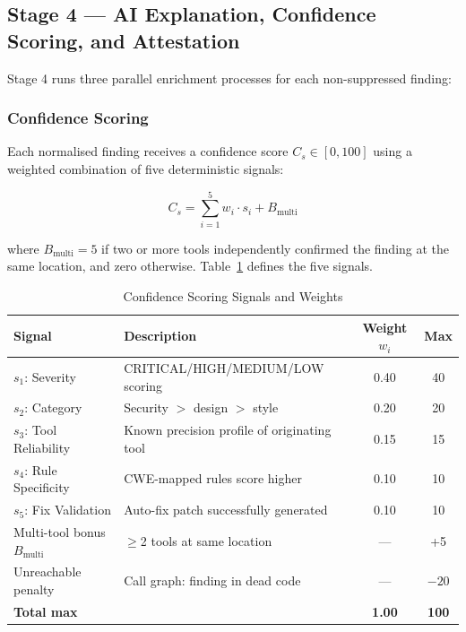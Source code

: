 \subsection{Stage 4 — AI Explanation, Confidence Scoring, and Attestation}
\label{subsec:stage4}

Stage 4 runs three parallel enrichment processes for each non-suppressed finding:

\subsubsection{Confidence Scoring}

Each normalised finding receives a confidence score $C_s \in [0, 100]$ using a weighted combination of five deterministic signals:

\begin{equation}
  C_s = \sum_{i=1}^{5} w_i \cdot s_i + B_{\text{multi}}
  \label{eq:confidence_score}
\end{equation}

\noindent where $B_{\text{multi}} = 5$ if two or more tools independently confirmed the finding at the same location, and zero otherwise. Table~\ref{tab:confidence_signals} defines the five signals.

\begin{table}[H]
\caption{Confidence Scoring Signals and Weights}
\label{tab:confidence_signals}
\centering
\renewcommand{\arraystretch}{1.3}
\begin{tabularx}{\textwidth}{@{} l X c c @{}}
\toprule
\textbf{Signal} & \textbf{Description} & \textbf{Weight $w_i$} & \textbf{Max} \\
\midrule
$s_1$: Severity         & CRITICAL/HIGH/MEDIUM/LOW scoring           & 0.40 & 40 \\
$s_2$: Category         & Security $>$ design $>$ style              & 0.20 & 20 \\
$s_3$: Tool Reliability & Known precision profile of originating tool & 0.15 & 15 \\
$s_4$: Rule Specificity & CWE-mapped rules score higher              & 0.10 & 10 \\
$s_5$: Fix Validation   & Auto-fix patch successfully generated      & 0.10 & 10 \\
\midrule
Multi-tool bonus $B_{\text{multi}}$ & $\geq$2 tools at same location & — & +5 \\
Unreachable penalty  & Call graph: finding in dead code            & — & $-20$ \\
\midrule
\textbf{Total max} & & \textbf{1.00} & \textbf{100} \\
\bottomrule
\end{tabularx}
\end{table}

